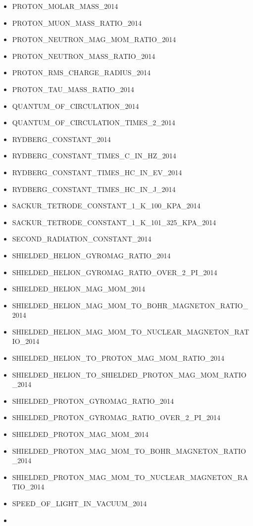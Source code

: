 \begin{itemize}
  PROTON\_MASS\_IN\_U\_2014
\item
  PROTON\_MOLAR\_MASS\_2014
\item
  PROTON\_MUON\_MASS\_RATIO\_2014
\item
  PROTON\_NEUTRON\_MAG\_MOM\_RATIO\_2014
\item
  PROTON\_NEUTRON\_MASS\_RATIO\_2014
\item
  PROTON\_RMS\_CHARGE\_RADIUS\_2014
\item
  PROTON\_TAU\_MASS\_RATIO\_2014
\item
  QUANTUM\_OF\_CIRCULATION\_2014
\item
  QUANTUM\_OF\_CIRCULATION\_TIMES\_2\_2014
\item
  RYDBERG\_CONSTANT\_2014
\item
  RYDBERG\_CONSTANT\_TIMES\_C\_IN\_HZ\_2014
\item
  RYDBERG\_CONSTANT\_TIMES\_HC\_IN\_EV\_2014
\item
  RYDBERG\_CONSTANT\_TIMES\_HC\_IN\_J\_2014
\item
  SACKUR\_TETRODE\_CONSTANT\_1\_K\_100\_KPA\_2014
\item
  SACKUR\_TETRODE\_CONSTANT\_1\_K\_101\_325\_KPA\_2014
\item
  SECOND\_RADIATION\_CONSTANT\_2014
\item
  SHIELDED\_HELION\_GYROMAG\_RATIO\_2014
\item
  SHIELDED\_HELION\_GYROMAG\_RATIO\_OVER\_2\_PI\_2014
\item
  SHIELDED\_HELION\_MAG\_MOM\_2014
\item
  SHIELDED\_HELION\_MAG\_MOM\_TO\_BOHR\_MAGNETON\_RATIO\_2014
\item
  SHIELDED\_HELION\_MAG\_MOM\_TO\_NUCLEAR\_MAGNETON\_RATIO\_2014
\item
  SHIELDED\_HELION\_TO\_PROTON\_MAG\_MOM\_RATIO\_2014
\item
  SHIELDED\_HELION\_TO\_SHIELDED\_PROTON\_MAG\_MOM\_RATIO\_2014
\item
  SHIELDED\_PROTON\_GYROMAG\_RATIO\_2014
\item
  SHIELDED\_PROTON\_GYROMAG\_RATIO\_OVER\_2\_PI\_2014
\item
  SHIELDED\_PROTON\_MAG\_MOM\_2014
\item
  SHIELDED\_PROTON\_MAG\_MOM\_TO\_BOHR\_MAGNETON\_RATIO\_2014
\item
  SHIELDED\_PROTON\_MAG\_MOM\_TO\_NUCLEAR\_MAGNETON\_RATIO\_2014
\item
  SPEED\_OF\_LIGHT\_IN\_VACUUM\_2014
\item

\end{itemize}

